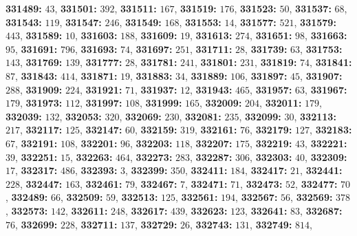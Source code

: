 \textsf{\bfseries 331489:} $43$, \textsf{\bfseries 331501:} $392$, \textsf{\bfseries 331511:} $167$, \textsf{\bfseries 331519:} $176$, \textsf{\bfseries 331523:} $50$, \textsf{\bfseries 331537:} $68$, \textsf{\bfseries 331543:} $119$, \textsf{\bfseries 331547:} $246$, \textsf{\bfseries 331549:} $168$, \textsf{\bfseries 331553:} $14$, \textsf{\bfseries 331577:} $521$, \textsf{\bfseries 331579:} $443$, \textsf{\bfseries 331589:} $10$, \textsf{\bfseries 331603:} $188$, \textsf{\bfseries 331609:} $19$, \textsf{\bfseries 331613:} $274$, \textsf{\bfseries 331651:} $98$, \textsf{\bfseries 331663:} $95$, \textsf{\bfseries 331691:} $796$, \textsf{\bfseries 331693:} $74$, \textsf{\bfseries 331697:} $251$, \textsf{\bfseries 331711:} $28$, \textsf{\bfseries 331739:} $63$, \textsf{\bfseries 331753:} $143$, \textsf{\bfseries 331769:} $139$, \textsf{\bfseries 331777:} $28$, \textsf{\bfseries 331781:} $241$, \textsf{\bfseries 331801:} $231$, \textsf{\bfseries 331819:} $74$, \textsf{\bfseries 331841:} $87$, \textsf{\bfseries 331843:} $414$, \textsf{\bfseries 331871:} $19$, \textsf{\bfseries 331883:} $34$, \textsf{\bfseries 331889:} $106$, \textsf{\bfseries 331897:} $45$, \textsf{\bfseries 331907:} $288$, \textsf{\bfseries 331909:} $224$, \textsf{\bfseries 331921:} $71$, \textsf{\bfseries 331937:} $12$, \textsf{\bfseries 331943:} $465$, \textsf{\bfseries 331957:} $63$, \textsf{\bfseries 331967:} $179$, \textsf{\bfseries 331973:} $112$, \textsf{\bfseries 331997:} $108$, \textsf{\bfseries 331999:} $165$, \textsf{\bfseries 332009:} $204$, \textsf{\bfseries 332011:} $179$, \textsf{\bfseries 332039:} $132$, \textsf{\bfseries 332053:} $320$, \textsf{\bfseries 332069:} $230$, \textsf{\bfseries 332081:} $235$, \textsf{\bfseries 332099:} $30$, \textsf{\bfseries 332113:} $217$, \textsf{\bfseries 332117:} $125$, \textsf{\bfseries 332147:} $60$, \textsf{\bfseries 332159:} $319$, \textsf{\bfseries 332161:} $76$, \textsf{\bfseries 332179:} $127$, \textsf{\bfseries 332183:} $67$, \textsf{\bfseries 332191:} $108$, \textsf{\bfseries 332201:} $96$, \textsf{\bfseries 332203:} $118$, \textsf{\bfseries 332207:} $175$, \textsf{\bfseries 332219:} $43$, \textsf{\bfseries 332221:} $39$, \textsf{\bfseries 332251:} $15$, \textsf{\bfseries 332263:} $464$, \textsf{\bfseries 332273:} $283$, \textsf{\bfseries 332287:} $306$, \textsf{\bfseries 332303:} $40$, \textsf{\bfseries 332309:} $17$, \textsf{\bfseries 332317:} $486$, \textsf{\bfseries 332393:} $3$, \textsf{\bfseries 332399:} $350$, \textsf{\bfseries 332411:} $184$, \textsf{\bfseries 332417:} $21$, \textsf{\bfseries 332441:} $228$, \textsf{\bfseries 332447:} $163$, \textsf{\bfseries 332461:} $79$, \textsf{\bfseries 332467:} $7$, \textsf{\bfseries 332471:} $71$, \textsf{\bfseries 332473:} $52$, \textsf{\bfseries 332477:} $70$, \textsf{\bfseries 332489:} $66$, \textsf{\bfseries 332509:} $59$, \textsf{\bfseries 332513:} $125$, \textsf{\bfseries 332561:} $194$, \textsf{\bfseries 332567:} $56$, \textsf{\bfseries 332569:} $378$, \textsf{\bfseries 332573:} $142$, \textsf{\bfseries 332611:} $248$, \textsf{\bfseries 332617:} $439$, \textsf{\bfseries 332623:} $123$, \textsf{\bfseries 332641:} $83$, \textsf{\bfseries 332687:} $76$, \textsf{\bfseries 332699:} $228$, \textsf{\bfseries 332711:} $137$, \textsf{\bfseries 332729:} $26$, \textsf{\bfseries 332743:} $131$, \textsf{\bfseries 332749:} $814$, 
